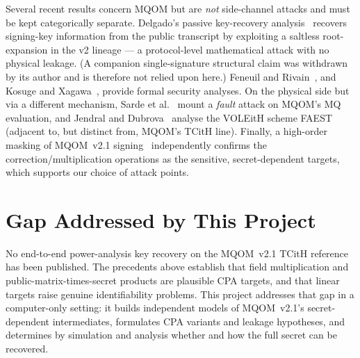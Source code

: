 Several recent results concern MQOM but are \emph{not} side-channel attacks and must be
kept categorically separate. Delgado's passive key-recovery analysis~\cite{delgado2026}
recovers signing-key information from the public transcript by exploiting a saltless
root-expansion in the v2 lineage --- a protocol-level mathematical attack with no
physical leakage. (A companion single-signature structural claim was withdrawn by its
author and is therefore not relied upon here.) Feneuil and
Rivain~\cite{feneuil2026ggm}, and Kosuge and Xagawa~\cite{kosuge2026formal}, provide
formal security analyses. On the physical side but via a different mechanism, Sarde et
al.~\cite{sarde2025fault} mount a \emph{fault} attack on MQOM's MQ evaluation, and
Jendral and Dubrova~\cite{jendral2025voleith} analyse the VOLEitH scheme FAEST (adjacent
to, but distinct from, MQOM's TCitH line). Finally, a high-order masking of MQOM~v2.1
signing~\cite{mqom2026masking} independently confirms the correction/multiplication
operations as the sensitive, secret-dependent targets, which supports our choice of
attack points.

\section{Gap Addressed by This Project}

No end-to-end power-analysis key recovery on the MQOM~v2.1 TCitH reference has been
published. The precedents above establish that field multiplication and
public-matrix-times-secret products are plausible CPA targets, and that linear targets
raise genuine identifiability problems. This project addresses that gap in a
computer-only setting: it builds independent models of MQOM~v2.1's secret-dependent
intermediates, formulates CPA variants and leakage hypotheses, and determines by
simulation and analysis whether and how the full secret can be recovered.
